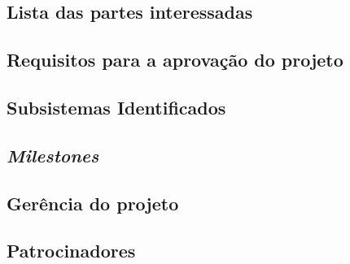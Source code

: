 \subsection{Lista das partes interessadas}
\subsection{Requisitos para a aprovação do projeto}
\subsection{Subsistemas Identificados}
\subsection{\textit{Milestones}}
\subsection{Gerência do projeto}
\subsection{Patrocinadores}
